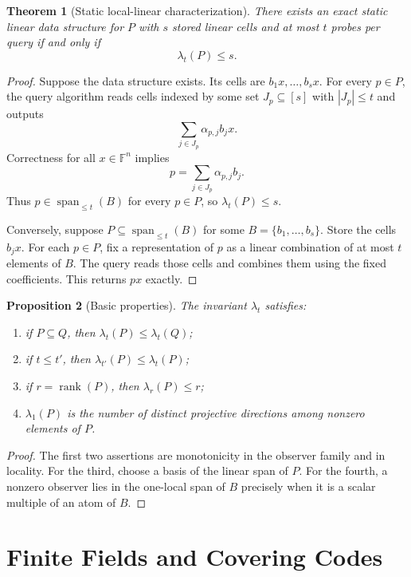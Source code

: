 \documentclass[11pt]{article}
\newtheorem{theorem}{Theorem}[section]
\newtheorem{proposition}[theorem]{Proposition}
\begin{document}
\begin{theorem}[Static local-linear characterization]
There exists an exact static linear data structure for $P$ with $s$ stored linear cells and at most $t$ probes per query if and only if
\[
\lambda_t(P)\le s.
\]
\end{theorem}

\begin{proof}
Suppose the data structure exists. Its cells are $b_1x,\ldots,b_sx$. For every $p\in P$, the query algorithm reads cells indexed by some set $J_p\subseteq [s]$ with $|J_p|\le t$ and outputs
\[
\sum_{j\in J_p}\alpha_{p,j} b_jx.
\]
Correctness for all $x\in\mathbb F^n$ implies
\[
p=\sum_{j\in J_p}\alpha_{p,j}b_j.
\]
Thus $p\in \operatorname{span}_{\le t}(B)$ for every $p\in P$, so $\lambda_t(P)\le s$.

Conversely, suppose $P\subseteq \operatorname{span}_{\le t}(B)$ for some $B=\{b_1,\ldots,b_s\}$. Store the cells $b_jx$. For each $p\in P$, fix a representation of $p$ as a linear combination of at most $t$ elements of $B$. The query reads those cells and combines them using the fixed coefficients. This returns $px$ exactly.
\end{proof}

\begin{proposition}[Basic properties]
The invariant $\lambda_t$ satisfies:
\begin{enumerate}
\item if $P\subseteq Q$, then $\lambda_t(P)\le \lambda_t(Q)$;
\item if $t\le t'$, then $\lambda_{t'}(P)\le \lambda_t(P)$;
\item if $r=\operatorname{rank}(P)$, then $\lambda_r(P)\le r$;
\item $\lambda_1(P)$ is the number of distinct projective directions among nonzero elements of $P$.
\end{enumerate}
\end{proposition}

\begin{proof}
The first two assertions are monotonicity in the observer family and in locality. For the third, choose a basis of the linear span of $P$. For the fourth, a nonzero observer lies in the one-local span of $B$ precisely when it is a scalar multiple of an atom of $B$.
\end{proof}

\section{Finite Fields and Covering Codes}
\end{document}
